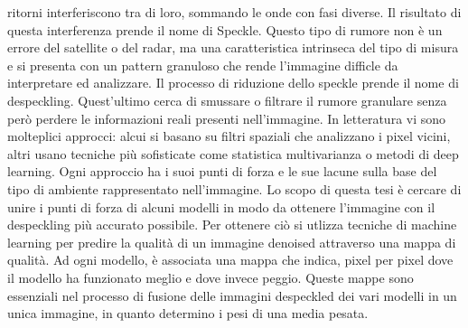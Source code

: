 ritorni interferiscono tra di loro, sommando le onde con fasi diverse. Il risultato di questa 
interferenza prende il nome di Speckle. Questo tipo di rumore non è un errore del satellite o 
del radar, ma una caratteristica intrinseca del tipo di misura e si presenta con un pattern granuloso
che rende l'immagine difficle da interpretare ed analizzare. Il processo di riduzione dello speckle 
prende il nome di despeckling. Quest'ultimo cerca di smussare o filtrare il rumore granulare senza 
però perdere le informazioni reali presenti nell'immagine. In letteratura vi sono molteplici 
approcci: alcui si basano su filtri spaziali che analizzano i pixel vicini, altri usano tecniche 
più sofisticate come statistica multivarianza o metodi di deep learning. Ogni approccio ha i suoi
punti di forza e le sue lacune sulla base del tipo di ambiente rappresentato nell'immagine. 
Lo scopo di questa tesi è cercare di unire i punti di forza di alcuni modelli in modo da ottenere l’immagine
con il despeckling più accurato possibile. Per ottenere ciò si utlizza tecniche di machine learning
per predire la qualità di un immagine denoised attraverso una mappa di qualità. Ad ogni modello,
è associata una mappa che indica, pixel per pixel dove il modello ha funzionato meglio e 
dove invece peggio. Queste mappe sono essenziali nel processo di fusione delle immagini despeckled 
dei vari modelli in un unica immagine, in quanto determino i pesi di una media pesata.
\medskip

